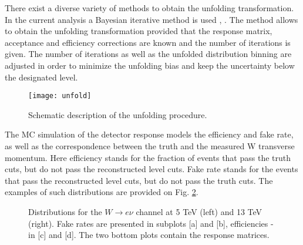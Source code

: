  There exist a diverse variety of methods to obtain the unfolding transformation. In the current analysis a Bayesian iterative method is used \cite{unfolding1}, \cite{unfolding2}. The method allows to obtain the unfolding transformation provided that the response matrix, acceptance and efficiency corrections are known and the number of iterations is given. The number of iterations as well as the unfolded distribution binning are adjusted in order to minimize the unfolding bias and keep the uncertainty below the designated level. 

\begin{figure}[htpb]
	\centering
	\texttt{[image: unfold]}
	\caption[Unfolding]{Schematic description of the unfolding procedure.}
	\label{fig::unfolding}
\end{figure}

The MC simulation of the detector response models the efficiency and fake rate, as well as the correspondence between the truth and the measured W transverse momentum. Here efficiency stands for the fraction of events that pass the truth cuts, but do not pass the reconstructed level cuts. Fake rate stands for the events that pass the reconstructed level cuts, but do not pass the truth cuts. The examples of such distributions are provided on Fig. \ref{fig:unfolding_parameters}.


     \begin{figure}[pt]
	\caption{Distributions for the $W\rightarrow e\nu$ channel at 5 TeV (left) and 13 TeV (right). Fake rates are presented in subplots [a] and [b], efficiencies - in [c] and [d]. The two bottom plots contain the response matrices.}
	\label{fig:unfolding_parameters}
\end{figure}

